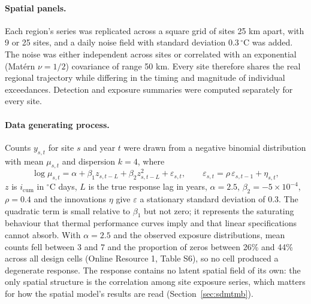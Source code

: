 \paragraph{Spatial panels.}
Each region's series was replicated across a square grid of sites 25 km apart, with 9 or 25 sites, and a daily noise field with standard deviation 0.3\,$^{\circ}$C was added. The noise was either independent across sites or correlated with an exponential (Mat\'ern $\nu = 1/2$) covariance of range 50 km. Every site therefore shares the real regional trajectory while differing in the timing and magnitude of individual exceedances. Detection and exposure summaries were computed separately for every site.

\paragraph{Data generating process.}
Counts $y_{s,t}$ for site $s$ and year $t$ were drawn from a negative binomial distribution with mean $\mu_{s,t}$ and dispersion $k = 4$, where
\begin{equation}
\log \mu_{s,t} = \alpha + \beta_1 z_{s,t-L} + \beta_2 z_{s,t-L}^{2} + \varepsilon_{s,t}, \qquad \varepsilon_{s,t} = \rho\,\varepsilon_{s,t-1} + \eta_{s,t},
\label{eq:dgp}
\end{equation}
$z$ is $i_{\mathrm{cum}}$ in $^{\circ}$C days, $L$ is the true response lag in years, $\alpha = 2.5$, $\beta_2 = -5 \times 10^{-4}$, $\rho = 0.4$ and the innovations $\eta$ give $\varepsilon$ a stationary standard deviation of 0.3. The quadratic term is small relative to $\beta_1$ but not zero; it represents the saturating behaviour that thermal performance curves imply \citep{sinclair2016} and that linear specifications cannot absorb. With $\alpha = 2.5$ and the observed exposure distributions, mean counts fell between 3 and 7 and the proportion of zeros between 26\% and 44\% across all design cells (Online Resource 1, Table S6), so no cell produced a degenerate response. The response contains no latent spatial field of its own: the only spatial structure is the correlation among site exposure series, which matters for how the spatial model's results are read (Section~\ref{sec:sdmtmb}).

